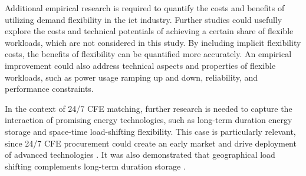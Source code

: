 Additional empirical research is required to quantify the costs and benefits of utilizing demand flexibility in the \gls{ict} industry.
Further studies could usefully explore the costs and technical potentials of achieving a certain share of flexible workloads, which are not considered in this study.
By including implicit flexibility costs, the benefits of flexibility can be quantified more accurately.
An empirical improvement could also address technical aspects and properties of flexible workloads, such as power usage ramping up and down, reliability, and performance constraints.

In the context of 24/7 CFE matching, further research is needed to capture the interaction of promising energy technologies, such as long-term duration energy storage and space-time load-shifting flexibility.
This case is particularly relevant, since 24/7 CFE procurement could create an early market and drive deployment of advanced technologies \cite{xu-247CFE-report,riepinMeansCostsSystemlevel2023}.
It was also demonstrated that geographical load shifting complements long-term duration storage \cite{riepinValueSpacetimeLoadshifting2023}.
